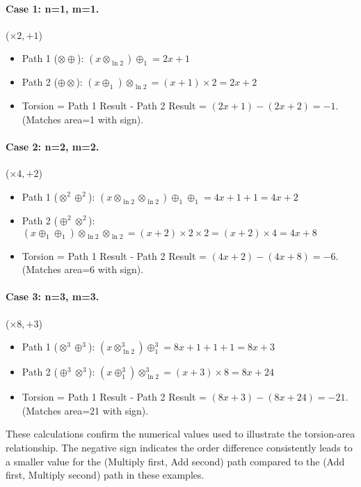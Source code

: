 \documentclass[12pt]{article}
\begin{document}
\paragraph{Case 1: n=1, m=1.} (\(\times 2, +1\))
\begin{itemize}
    \item Path 1 (\( \otimes \oplus \)): \( (x \otimes_{\ln 2}) \oplus_1 = 2x + 1 \)
    \item Path 2 (\( \oplus \otimes \)): \( (x \oplus_1) \otimes_{\ln 2} = (x+1) \times 2 = 2x + 2 \)
    \item Torsion = Path 1 Result - Path 2 Result = \( (2x+1) - (2x+2) = -1 \). (Matches area=1 with sign).
\end{itemize}

\paragraph{Case 2: n=2, m=2.} (\(\times 4, +2\))
\begin{itemize}
    \item Path 1 (\( \otimes^2 \oplus^2 \)): \( (x \otimes_{\ln 2} \otimes_{\ln 2}) \oplus_1 \oplus_1 = 4x + 1 + 1 = 4x + 2 \)
    \item Path 2 (\( \oplus^2 \otimes^2 \)): \( (x \oplus_1 \oplus_1) \otimes_{\ln 2} \otimes_{\ln 2} = (x+2) \times 2 \times 2 = (x+2) \times 4 = 4x + 8 \)
    \item Torsion = Path 1 Result - Path 2 Result = \( (4x+2) - (4x+8) = -6 \). (Matches area=6 with sign).
\end{itemize}

\paragraph{Case 3: n=3, m=3.} (\(\times 8, +3\))
\begin{itemize}
    \item Path 1 (\( \otimes^3 \oplus^3 \)): \( (x \otimes_{\ln 2}^3) \oplus_1^3 = 8x + 1 + 1 + 1 = 8x + 3 \)
    \item Path 2 (\( \oplus^3 \otimes^3 \)): \( (x \oplus_1^3) \otimes_{\ln 2}^3 = (x+3) \times 8 = 8x + 24 \)
    \item Torsion = Path 1 Result - Path 2 Result = \( (8x+3) - (8x+24) = -21 \). (Matches area=21 with sign).
\end{itemize}
These calculations confirm the numerical values used to illustrate the torsion-area relationship. The negative sign indicates the order difference consistently leads to a smaller value for the (Multiply first, Add second) path compared to the (Add first, Multiply second) path in these examples.
\end{document}
